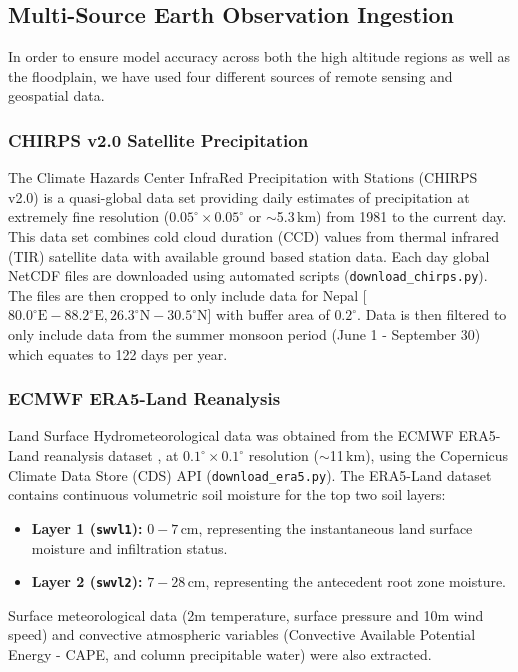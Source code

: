 \documentclass[journal]{IEEEtran}
\begin{document}
\subsection{Multi-Source Earth Observation Ingestion}
In order to ensure model accuracy across both the high altitude regions as well as the floodplain, we have used four different sources of remote sensing and geospatial data.

\subsubsection{CHIRPS v2.0 Satellite Precipitation}
The Climate Hazards Center InfraRed Precipitation with Stations (CHIRPS v2.0) \cite{funk2015climate} is a quasi-global data set providing daily estimates of precipitation at extremely fine resolution ($0.05^\circ \times 0.05^\circ$ or $\sim$5.3\,km) from 1981 to the current day. This data set combines cold cloud duration (CCD) values from thermal infrared (TIR) satellite data with available ground based station data. Each day global NetCDF files are downloaded using automated scripts (\texttt{download\_chirps.py}). The files are then cropped to only include data for Nepal [$80.0^\circ\text{E} - 88.2^\circ\text{E}, 26.3^\circ\text{N} - 30.5^\circ\text{N}$] with buffer area of $0.2^\circ$. Data is then filtered to only include data from the summer monsoon period (June 1 - September 30) which equates to 122 days per year.

\subsubsection{ECMWF ERA5-Land Reanalysis}
Land Surface Hydrometeorological data was obtained from the ECMWF ERA5-Land reanalysis dataset \cite{munoz2021era5}, at $0.1^\circ \times 0.1^\circ$ resolution ($\sim$11\,km), using the Copernicus Climate Data Store (CDS) API (\texttt{download\_era5.py}). The ERA5-Land dataset contains continuous volumetric soil moisture for the top two soil layers:
\begin{itemize}
\item \textbf{Layer 1 (\texttt{swvl1}):} $0 - 7$\,cm, representing the instantaneous land surface moisture and infiltration status.
\item \textbf{Layer 2 (\texttt{swvl2}):} $7 - 28$\,cm, representing the antecedent root zone moisture.
\end{itemize}
Surface meteorological data (2m temperature, surface pressure and 10m wind speed) and convective atmospheric variables (Convective Available Potential Energy - CAPE, and column precipitable water) were also extracted.
\end{document}

